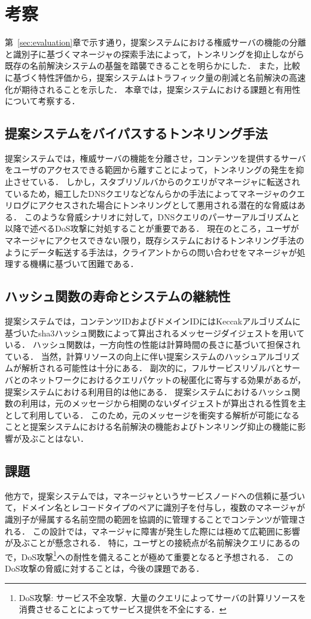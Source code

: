 \section{考察}
第~\ref{sec:evaluation}章で示す通り，提案システムにおける権威サーバの機能の分離と識別子に基づくマネージャの探索手法によって，トンネリングを抑止しながら既存の名前解決システムの基盤を踏襲できることを明らかにした．
また，比較に基づく特性評価から，提案システムはトラフィック量の削減と名前解決の高速化が期待されることを示した．
本章では，提案システムにおける課題と有用性について考察する．

\subsection{提案システムをバイパスするトンネリング手法}
提案システムでは，権威サーバの機能を分離させ，コンテンツを提供するサーバをユーザのアクセスできる範囲から離すことによって，トンネリングの発生を抑止させている．
しかし，スタブリゾルバからのクエリがマネージャに転送されているため，細工したDNSクエリなどなんらかの手法によってマネージャのクエリログにアクセスされた場合にトンネリングとして悪用される潜在的な脅威はある．
このような脅威シナリオに対して，DNSクエリのパーサーアルゴリズムと以降で述べるDoS攻撃に対処することが重要である．
現在のところ，ユーザがマネージャにアクセスできない限り，既存システムにおけるトンネリング手法のようにデータ転送する手法は，クライアントからの問い合わせをマネージャが処理する機構に基づいて困難である．

\subsection{ハッシュ関数の寿命とシステムの継続性}
提案システムでは，コンテンツIDおよびドメインIDにはKeccakアルゴリズムに基づいたsha3ハッシュ関数によって算出されるメッセージダイジェストを用いている．
ハッシュ関数は，一方向性の性能は計算時間の長さに基づいて担保されている．
当然，計算リソースの向上に伴い提案システムのハッシュアルゴリズムが解析される可能性は十分にある．
副次的に，フルサービスリゾルバとサーバとのネットワークにおけるクエリパケットの秘匿化に寄与する効果があるが，提案システムにおける利用目的は他にある．
提案システムにおけるハッシュ関数の利用は，元のメッセージから相関のないダイジェストが算出される性質を主として利用している．
このため，元のメッセージを衝突する解析が可能になることと提案システムにおける名前解決の機能およびトンネリング抑止の機能に影響が及ぶことはない．

\subsection{課題}
他方で，提案システムでは，マネージャというサービスノードへの信頼に基づいて，ドメイン名とレコードタイプのペアに識別子を付与し，複数のマネージャが識別子が帰属する名前空間の範囲を協調的に管理することでコンテンツが管理される．
この設計では，マネージャに障害が発生した際には極めて広範囲に影響が及ぶことが懸念される．
特に，ユーザとの接続点が名前解決クエリにあるので，DoS攻撃\footnote{DoS攻撃: サービス不全攻撃．大量のクエリによってサーバの計算リソースを消費させることによってサービス提供を不全にする．}への耐性を備えることが極めて重要となると予想される．
このDoS攻撃の脅威に対することは，今後の課題である．

